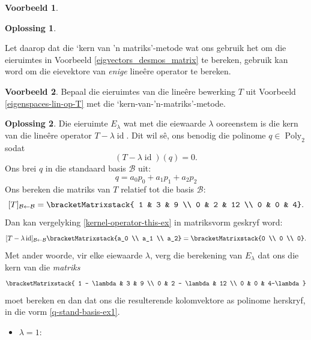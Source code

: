 \documentclass[a4paper,11pt]{book}
\theoremstyle{definition}
\newtheorem{example_environment}{Voorbeeld}[chapter]
\newtheorem*{solution}{Oplossing}
\newcommand{\basis}[1]{{\mathcal #1}}
\newcommand{\cmatrix}[1]{\bracketMatrixstack{#1}}
\newenvironment{example}
	{
		\begin{oframed}
		\begin{example_environment}
	}
	{
		\end{example_environment}
		\end{oframed}
	}
\DeclareMathOperator{\Poly}{Poly}
\DeclareMathOperator{\id}{id}
\begin{document}
\begin{example}
\begin{solution}
\begin{itemize}
		\end{itemize} 
	\end{solution}
\end{example}
Let daarop dat die `kern van 'n matriks'-metode wat ons gebruik het om die
eieruimtes in Voorbeeld \ref{eigvectors_desmos_matrix} te bereken, gebruik
kan word om die eievektore van \emph{enige} line{\^e}re operator te
bereken.
\begin{example} Bepaal die eieruimtes van die line{\^e}re bewerking $T$ uit
	Voorbeeld \ref{eigenspaces-lin-op-T} met die
	`kern-van-'n-matriks'-metode.

	\begin{solution} Die eieruimte $E_\lambda$ wat met die eiewaarde
		$\lambda$ ooreenstem is die kern van die line{\^e}re operator $T -
		\lambda \id$. Dit wil s{\^e}, ons benodig die polinome $q \in
		\Poly_2$ sodat
		\begin{equation} \label{kernel-operator-this-ex}
			(T - \lambda \id) (q) = 0.
		\end{equation}
		Ons brei $q$ in die standaard basis $\basis{B}$ uit:
		\begin{equation} \label{q-stand-basis-ex1}
			q = a_0 p_0 + a_1 p_1 + a_2 p_2
		\end{equation}
		Ons bereken die matriks van $T$ relatief tot die basis $\basis{B}$:
		\[
			[T]_{\basis{B} \leftarrow \basis{B}} = \cmatrix{ 1 & 3 & 9 \\ 0
			& 2 & 12 \\ 0 & 0 & 4}.
		\]
		Dan kan vergelyking \eqref{kernel-operator-this-ex} in matriksvorm
		geskryf word:
		\[
			[T - \lambda \id]_{\basis{B} \leftarrow \basis{B}} \cmatrix{a_0
			\\ a_1 \\ a_2} = \cmatrix{0 \\ 0 \\ 0}.
		\]
		Met ander woorde, vir elke eiewaarde $\lambda$, verg die berekening
		van $E_\lambda$ dat ons die kern van die \emph{matriks}
		\[
			\cmatrix{ 1 - \lambda & 3 & 9 \\
			0 & 2 - \lambda & 12 \\
			0 & 0 & 4-\lambda}
		\]
		moet bereken en dan dat ons die resulterende kolomvektore as
		polinome herskryf, in die vorm \eqref{q-stand-basis-ex1}.

		\begin{itemize}

			\item $\lambda = 1$:


\end{itemize}
\end{solution}
\end{example}
\end{document}
